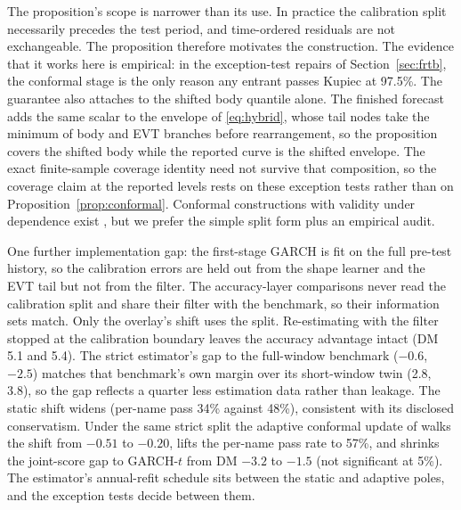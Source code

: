 \documentclass[11pt]{article}
\theoremstyle{remark}
\begin{document}
The proposition's scope is narrower than its use. In practice the calibration split necessarily precedes the test period, and time-ordered residuals are not exchangeable. The proposition therefore motivates the construction. The evidence that it works here is empirical: in the exception-test repairs of Section~\ref{sec:frtb}, the conformal stage is the only reason any entrant passes Kupiec at 97.5\%. The guarantee also attaches to the shifted body quantile alone. The finished forecast adds the same scalar to the envelope of \eqref{eq:hybrid}, whose tail nodes take the minimum of body and EVT branches before rearrangement, so the proposition covers the shifted body while the reported curve is the shifted envelope. The exact finite-sample coverage identity need not survive that composition, so the coverage claim at the reported levels rests on these exception tests rather than on Proposition~\ref{prop:conformal}. Conformal constructions with
validity under dependence exist \citep{chernozhukov2018conformal, barber2023, gibbs2021aci}, but we
prefer the simple split form plus an empirical audit.

One further
implementation gap: the first-stage
GARCH is fit on the full pre-test history, so the calibration errors
are held out from the shape learner and the EVT tail but not from the
filter. The accuracy-layer comparisons never read the calibration split
and share their filter with the benchmark, so their information sets
match. Only the overlay's shift uses the split. Re-estimating with the filter stopped at the calibration boundary leaves the accuracy advantage intact (DM 5.1 and 5.4). The strict estimator's gap to the full-window benchmark ($-0.6$, $-2.5$) matches that benchmark's own margin over its short-window twin (2.8, 3.8), so the gap reflects a quarter less estimation data rather than leakage. The static shift widens (per-name pass 34\% against
48\%), consistent with its disclosed conservatism. Under the same strict
split the adaptive conformal update of \citet{gibbs2021aci} walks the shift from
$-0.51$ to $-0.20$, lifts the per-name pass rate to 57\%, and shrinks the
joint-score gap to GARCH-$t$ from DM $-3.2$ to $-1.5$ (not significant at
5\%). The estimator's annual-refit
schedule sits between the static and adaptive poles, and the exception
tests decide between them.
\end{document}

